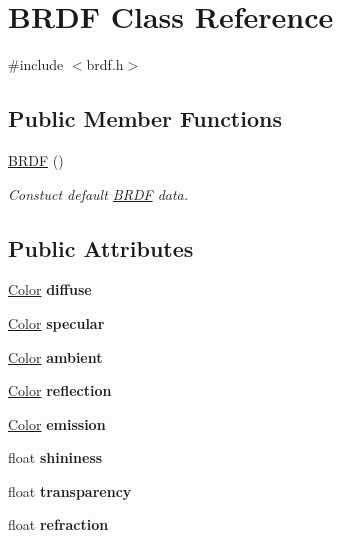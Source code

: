 \hypertarget{class_b_r_d_f}{}\section{B\+R\+DF Class Reference}
\label{class_b_r_d_f}


{\ttfamily \#include $<$brdf.\+h$>$}

\subsection*{Public Member Functions}
\begin{DoxyCompactItemize}
\item 
\mbox{\label{class_b_r_d_f_a453d38b012c433272b117864f1902c52}} 
\mbox{\hyperlink{class_b_r_d_f_a453d38b012c433272b117864f1902c52}{B\+R\+DF}} ()
\begin{DoxyCompactList}\small\item\em Constuct default \mbox{\hyperlink{class_b_r_d_f}{B\+R\+DF}} data. \end{DoxyCompactList}\end{DoxyCompactItemize}
\subsection*{Public Attributes}
\begin{DoxyCompactItemize}
\item 
\mbox{\label{class_b_r_d_f_a529cb616b5ce7efbdd1bf2295ef79e5e}} 
\mbox{\hyperlink{class_color}{Color}} {\bfseries diffuse}
\item 
\mbox{\label{class_b_r_d_f_a00a221697758cf3ff6bdbce5521155c7}} 
\mbox{\hyperlink{class_color}{Color}} {\bfseries specular}
\item 
\mbox{\label{class_b_r_d_f_aa8259dbee5390390b353001a115fcc8b}} 
\mbox{\hyperlink{class_color}{Color}} {\bfseries ambient}
\item 
\mbox{\label{class_b_r_d_f_a39a2c08085aa82c1e81dc958ec2e38e9}} 
\mbox{\hyperlink{class_color}{Color}} {\bfseries reflection}
\item 
\mbox{\label{class_b_r_d_f_a36c0fafddbbddb6126aa8c8c8e8c8cbf}} 
\mbox{\hyperlink{class_color}{Color}} {\bfseries emission}
\item 
\mbox{\label{class_b_r_d_f_aaa135c0cfd0658938c3b73aa28dba507}} 
float {\bfseries shininess}
\item 
\mbox{\label{class_b_r_d_f_abce1b89e4bd6ff8f49e46099f930fe25}} 
float {\bfseries transparency}
\item 
\mbox{\label{class_b_r_d_f_a3923b1099de9b0d336dccc6935994946}} 
float {\bfseries refraction}
\end{DoxyCompactItemize}


